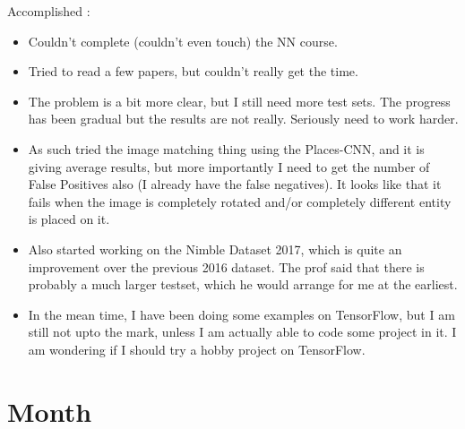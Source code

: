 \documentclass{article}
\begin{document}
Accomplished :
\begin{itemize}
\item Couldn't complete (couldn't even touch) the NN course.
\item Tried to read a few papers, but couldn't really get the time.
\item The problem is a bit more clear, but I still need more test sets. The progress has been gradual but the results are not really. Seriously need to work harder.
\item As such tried the image matching thing using the Places-CNN, and it is giving average results, but more importantly I need to get the number of False Positives also (I already have the false negatives). It looks like that it fails when the image is completely rotated and/or completely different entity is placed on it.
\item Also started working on the Nimble Dataset 2017, which is quite an improvement over the previous 2016 dataset. The prof said that there is probably a much larger testset, which he would arrange for me at the earliest.
\item In the mean time, I have been doing some examples on TensorFlow, but I am still not upto the mark, unless I am actually able to code some project in it. I am wondering if I should try a hobby project on TensorFlow.
\end{itemize}

\section{Month}
\end{document}
